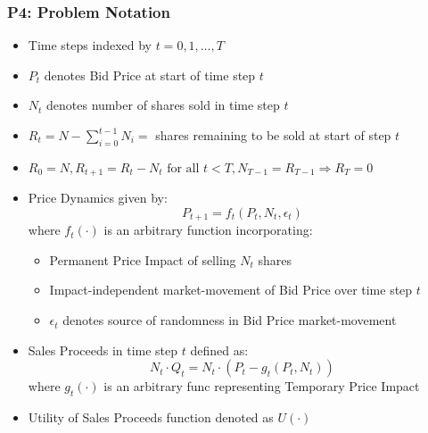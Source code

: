 \documentclass[handout]{beamer}
\begin{document}
\begin{frame}
\frametitle{P4: Problem Notation}
\pause
\begin{itemize}[<+->]
\item Time steps indexed by $t = 0, 1, \ldots, T$
\item $P_t$ denotes Bid Price at start of time step $t$
\item $N_t$ denotes number of shares sold in time step $t$
\item $R_t = N - \sum_{i=0}^{t-1}N_i = $ shares remaining to be sold at start of step $t$
\item $R_0 = N, R_{t+1}  = R_t - N_t \text{ for all } t < T, N_{T-1} = R_{T-1} \Rightarrow R_T = 0$
\item Price Dynamics given by:
$$P_{t+1} = f_t(P_t, N_t, \epsilon_t)$$
where $f_t(\cdot)$ is an arbitrary function incorporating:
\begin{itemize}
\item Permanent Price Impact of selling $N_t$ shares
\item Impact-independent market-movement of Bid Price over time step $t$
\item $\epsilon_t$ denotes source of randomness in Bid Price market-movement
\end{itemize}
\item Sales Proceeds in time step $t$ defined as:
$$N_t \cdot Q_t = N_t \cdot (P_t - g_t(P_t, N_t))$$
where $g_t(\cdot)$ is an arbitrary func representing Temporary Price Impact
\item Utility of Sales Proceeds function denoted as $U(\cdot)$
\end{itemize}
\end{frame}
\end{document}
